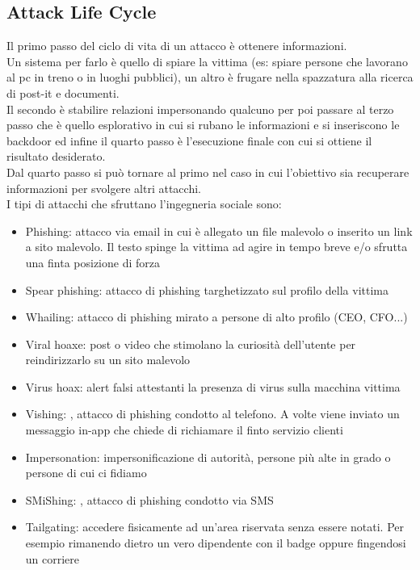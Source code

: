 \subsection{Attack Life Cycle}
Il primo passo del ciclo di vita di un attacco è ottenere informazioni.\\
Un sistema per farlo è quello di spiare la vittima (es: spiare persone che lavorano al pc in treno o in luoghi pubblici), un altro è frugare nella spazzatura alla ricerca di post-it e documenti.\\
Il secondo è stabilire relazioni impersonando qualcuno per poi passare al terzo passo che è quello esplorativo in cui si rubano le informazioni e si inseriscono le backdoor ed infine il quarto passo è l'esecuzione finale con cui si ottiene il risultato desiderato.\\
Dal quarto passo si può tornare al primo nel caso in cui l'obiettivo sia recuperare informazioni per svolgere altri attacchi.\\
I tipi di attacchi che sfruttano l'ingegneria sociale sono:
\begin{itemize}[noitemsep]
    \item Phishing: attacco via email in cui è allegato un file malevolo o inserito un link a sito malevolo. Il testo spinge la vittima ad agire in tempo breve e/o sfrutta una finta posizione di forza
    \item Spear phishing: attacco di phishing targhetizzato sul profilo della vittima
    \item Whailing: attacco di phishing mirato a persone di alto profilo (CEO, CFO...)
    \item Viral hoaxe: post o video che stimolano la curiosità dell'utente per reindirizzarlo su un sito malevolo
    \item Virus hoax: alert falsi attestanti la presenza di virus sulla macchina vittima
    \item Vishing: , attacco di phishing condotto al telefono. A volte viene inviato un messaggio in-app che chiede di richiamare il finto servizio clienti
    \item Impersonation: impersonificazione di autorità, persone più alte in grado o persone di cui ci fidiamo
    \item SMiShing: , attacco di phishing condotto via SMS
    \item Tailgating: accedere fisicamente ad un'area riservata senza essere notati. Per esempio rimanendo dietro un vero dipendente con il badge oppure fingendosi un corriere
\end{itemize}

